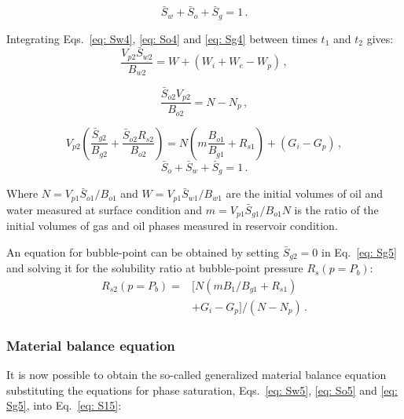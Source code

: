 \documentclass[final,authoryear,5p,times,twocolumn,10pt]{elsarticle}
\begin{document}
\begin{equation}\label{eq: S14}
\bar{S}_w+\bar{S}_o+\bar{S}_g=1 \, .
\end{equation}

Integrating Eqs.~\eqref{eq: Sw4}, \eqref{eq: So4} and \eqref{eq: Sg4} between times $t_1$ and $t_2$ gives:
\begin{equation}\label{eq: Sw5}
\frac{V_{p2} \bar{S}_{w2}}{B_{w2}}=W+\left(W_i+W_e-W_p\right) \, ,
\end{equation}

\begin{equation}\label{eq: So5}
\frac{\bar{S}_{o2} V_{p2}}{B_{o2}} = N-N_p \, ,
\end{equation}

\begin{equation}\label{eq: Sg5}
V_{p2}\left(\frac{\bar{S}_{g2}}{B_{g2}} +\frac{\bar{S}_{o2} R_{s2}}{B_{o2}}\right) = N\left(m\frac{B_{o1}}{B_{g1}} + R_{s1}\right) +\left(G_i-G_p\right) \, ,
\end{equation}
%
\begin{equation}\label{eq: S15}
\bar{S}_o+\bar{S}_w+\bar{S}_g=1 \, .
\end{equation}

Where $N=V_{p1} \bar{S}_{o1}/B_{o1}$ and $W=V_{p1} \bar{S}_{w1}/B_{w1}$ are the initial volumes of oil and water measured at surface condition and $m=V_{p1} \bar{S}_{g1}/B_{o1} N$ is the ratio of the initial volumes of gas and oil phases measured in reservoir condition.

An equation for bubble-point can be obtained by setting $\bar{S}_{g2}=0$ in Eq.~\eqref{eq: Sg5} and solving it for the solubility ratio at bubble-point pressure $R_s(p=P_b)$:
\begin{equation}
\begin{split}
R_{s2}\left(p=P_b\right) = &\Big[N\left(m B_{1}/B_{g1} +R_{s1}\right)\\
&+G_i-G_p\Big]/\left(N-N_p\right) \, .
\end{split}
\end{equation}

\subsubsection{Material balance equation}

It is now possible to obtain the so-called generalized material balance equation substituting the equations for phase saturation, Eqs.~\eqref{eq: Sw5}, \eqref{eq: So5} and \eqref{eq: Sg5}, into Eq.~\eqref{eq: S15}:  
\end{document}

